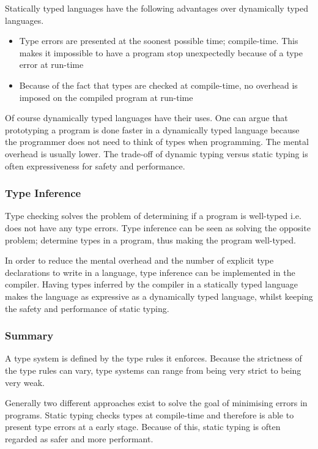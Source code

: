 Statically typed languages have the following advantages over dynamically typed languages.

\begin{itemize}
  \item Type errors are presented at the soonest possible time; compile-time. This makes it impossible to have a program stop unexpectedly because of a type error at run-time
  \item Because of the fact that types are checked at compile-time, no overhead is imposed on the compiled program at run-time
\end{itemize}

Of course dynamically typed languages have their uses. One can argue that prototyping a program is done faster in a dynamically typed language because the programmer does not need to think of types when programming. The mental overhead is usually lower. The trade-off of dynamic typing versus static typing is often expressiveness for safety and performance. 

\subsubsection{Type Inference}
Type checking solves the problem of determining if a program is well-typed i.e. does not have any type errors. Type inference can be seen as solving the opposite problem; determine types in a program, thus making the program well-typed.

In order to reduce the mental overhead and the number of explicit type declarations to write in a language, type inference can be implemented in the compiler. Having types inferred by the compiler in a statically typed language makes the language as expressive as a dynamically typed language, whilst keeping the safety and performance of static typing.

\subsubsection{Summary}
A type system is defined by the type rules it enforces. Because the strictness of the type rules can vary, type systems can range from being very strict to being very weak.

Generally two different approaches exist to solve the goal of minimising errors in programs. Static typing checks types at compile-time and therefore is able to present type errors at a early stage. Because of this, static typing is often regarded as safer and more performant.

